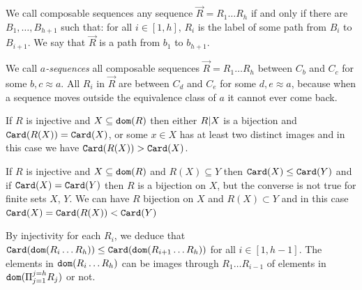 \documentclass{lmcs}
\begin{document}
We call composable sequences any sequence
$\vec{R} = R_{1} \ldots R_{h}$ if and only if there are $B_1, \ldots, B_{h+1}$
such that: for all $i \in [1,h]$, $R_i$ is the label of some path from $B_i$ to $B_{i+1}$.
We say that $\vec{R}$ is a path from $b_1$ to $b_{h+1}$.

We call \emph{$a$-sequences} all composable sequences 
$\vec{R} = R_{1} \ldots R_{h}$ between $C_b$ and $C_c$ for some $b, c \approx a$.
All $R_i$ in $\vec{R}$ are between $C_d$ and $C_e$ for some $d,e \approx a$,
because when a sequence moves outside the equivalence class of $a$ it cannot ever come back.

If $R$ is injective and $X \subseteq {\tt dom}(R)$ then either $R {|} X$ is a bijection
and ${\tt Card}(R(X)) = {\tt Card}(X)$,
or some $x \in X$ has at least two distinct images and in this case 
we have ${\tt Card}(R(X)) > {\tt Card}(X)$.

If $R$ is injective and $X \subseteq {\tt dom}(R)$ and $R(X) \subseteq Y$ then
${\tt Card}(X) \le {\tt Card}(Y)$ and if ${\tt Card}(X) = {\tt Card}(Y)$ then $R$ is a bijection
on $X$, but the converse is not true for finite sets $X$, $Y$. 
We can have $R$ bijection on $X$ and
$R(X) \subset Y$ and in this case ${\tt Card}(X) = {\tt Card}(R(X)) < {\tt Card}(Y)$

By injectivity for each $R_i$, we deduce that ${\tt Card}({\tt dom}(R_i \ldots R_h))
\le {\tt Card}({\tt dom}(R_{i+1}\ldots R_h))$ for all $i \in [1,h-1]$. The 
elements in ${\tt dom}(R_i \ldots R_h)$ can be images through $R_1 \ldots R_{i-1}$ of elements
in ${\tt dom}(\Pi_{j=1}^{j=h} R_j)$ or not.
\end{document}
